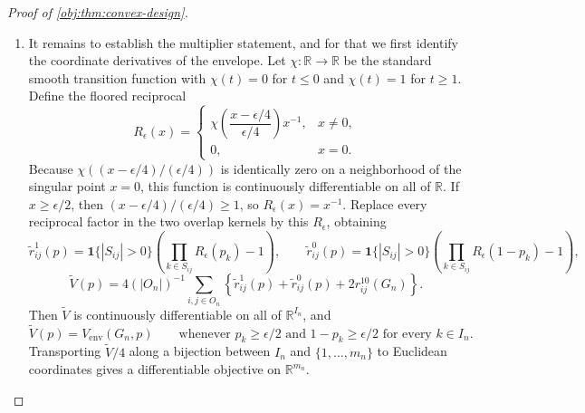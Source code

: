 \begin{proof}[Proof of \cref{obj:thm:convex-design}]
\begin{enumerate}
\item It remains to establish the multiplier statement, and for that we first identify the coordinate derivatives of the envelope.  Let \(\chi:\mathbb R\to\mathbb R\) be the standard smooth transition function with \(\chi(t)=0\) for \(t\le0\) and \(\chi(t)=1\) for \(t\ge1\).  Define the floored reciprocal
\[
R_\epsilon(x)=
\begin{cases}
\chi\!\left(\dfrac{x-\epsilon/4}{\epsilon/4}\right)x^{-1},&x\neq0,\\[0.6em]
0,&x=0.
\end{cases}
\]
Because \(\chi((x-\epsilon/4)/(\epsilon/4))\) is identically zero on a neighborhood of the singular point \(x=0\), this function is continuously differentiable on all of \(\mathbb R\).  If \(x\ge\epsilon/2\), then \((x-\epsilon/4)/(\epsilon/4)\ge1\), so \(R_\epsilon(x)=x^{-1}\).  Replace every reciprocal factor in the two overlap kernels by this \(R_\epsilon\), obtaining
\[
\widetilde r^1_{ij}(p)=\mathbf 1\{|S_{ij}|>0\}\left(\prod_{k\in S_{ij}}R_\epsilon(p_k)-1\right),
\qquad
\widetilde r^0_{ij}(p)=\mathbf 1\{|S_{ij}|>0\}\left(\prod_{k\in S_{ij}}R_\epsilon(1-p_k)-1\right),
\]
\[
\widetilde V(p)=4(|O_n|)^{-1}\sum_{i,j\in O_n}
\left\{\widetilde r^1_{ij}(p)+\widetilde r^0_{ij}(p)+2r^{10}_{ij}(G_n)\right\}.
\]
Then \(\widetilde V\) is continuously differentiable on all of \(\mathbb R^{I_n}\), and
\[
\widetilde V(p)=V_{\mathrm{env}}(G_n,p)
\qquad\text{whenever }p_k\ge\epsilon/2\text{ and }1-p_k\ge\epsilon/2\text{ for every }k\in I_n .
\]
Transporting \(\widetilde V/4\) along a bijection between \(I_n\) and \(\{1,\ldots,m_n\}\) to Euclidean coordinates gives a differentiable objective on \(\mathbb R^{m_n}\).


\end{enumerate}
\end{proof}
